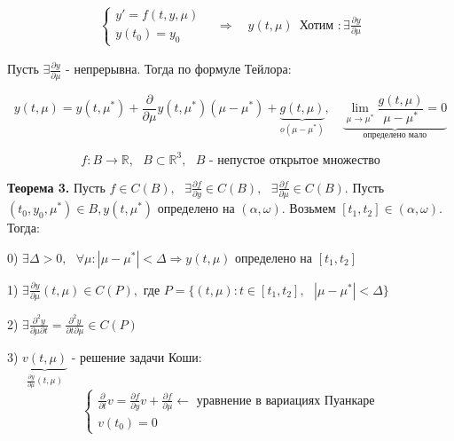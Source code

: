 \documentclass[12pt, a4paper]{report}
\begin{document}
\[ \begin{aligned}
\begin{cases}
y ' = f(t,y , \mu ) \\ 
y (t_0 )= y_0 
\end{cases}
\quad \Rightarrow \quad  
y(t, \mu) \, \text{ Хотим }: \exists  \frac{\partial  y }{\partial  \mu } 
\end{aligned} \] 

Пусть  \( \exists  \frac{\partial  y }{\partial \mu }  \) - непрерывна. Тогда по формуле Тейлора: 

\[ y(t, \mu ) = y(t, \mu^* ) + \frac{\partial  }{\partial  \mu } y(t,\mu ^* ) (\mu - \mu^* ) +\underbrace{ g (t, \mu )}_{o(\mu - \mu^*)} , \quad  \underbrace{\lim_{\mu  \to \mu^ * } \frac{ g(t, \mu )}{\mu - \mu^* } = 0}_{\text{определено мало} }   \] 

\[ f: B \to  \mathbb{R} , \text{ }  B \subset \mathbb{R}    ^3  , \text{ }  B \text{ - непустое открытое множество}  \] 

\begin{flushleft}
    \textbf{Теорема 3.}  Пусть \(  f \in  C (B ) , \text{ }  \exists  \frac{\partial  f }{\partial  y } \in  C (B ) , \text{  } \exists  \frac{\partial  f }{\partial  \mu } \in  C (B )     \). Пусть \( (t_0 , y_0 , \mu^* ) \in  B   , y(t, \mu ^* )   \)  определено на \( (\alpha , \omega ) \). Возьмем \( [t_1,t_2 ] \in (\alpha , \omega ) \). Тогда: 
    
    0) \( \displaystyle  \exists  \Delta > 0 , \text{ }  \forall  \mu : |\mu - \mu^*    |  < \Delta \Rightarrow y( t, \mu )\) определено на \( [ t_1,t_2 ] \) 

    1) \(\displaystyle  \exists  \frac{\partial  y }{\partial  \mu } (t, \mu) \in  C (P) ,  \) где \( P= \{(t,\mu ): t \in  [t_1, t_2 ] , \text{ } |\mu - \mu^* | < \Delta \} \) 

    2) \( \displaystyle  \exists  \frac{\partial  ^2 y } {\partial  \mu \partial  t } = \frac{ \partial  ^2 y }{\partial  t \partial  \mu } \in  C(P)   \) 

    3) \( \underbrace{v ( t ,\mu )}_{\frac{\partial  y }{\partial  \mu }(t,\mu ) } \) - решение задачи Коши: 
    \[ \begin{cases}
        \displaystyle \frac{\partial  }{\partial  t } v = \frac{\partial  f } {\partial  y }v + \frac{\partial  f }{\partial  \mu } \xleftarrow{ }  \text{ уравнение в вариациях Пуанкаре}  \\ 
        v(t_0 )  = 0   
        \end{cases}  \]  
\end{flushleft}
\end{document}
